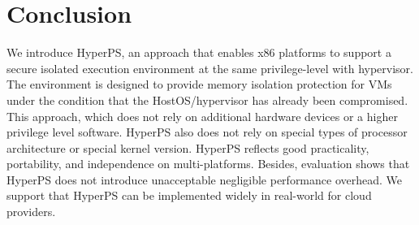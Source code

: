 \section{Conclusion}\label{sec:conclusion}
We introduce HyperPS, an approach that enables x86 platforms to support a secure isolated execution environment at the same privilege-level with hypervisor. The environment is designed to provide memory isolation protection for VMs under the condition that the HostOS/hypervisor has already been compromised. 
This approach, which does not rely on additional hardware devices or a higher privilege level software. HyperPS also does not rely on special types of processor architecture or special kernel version.
HyperPS reflects good practicality, portability, and independence on multi-platforms. Besides, evaluation shows that HyperPS does not introduce unacceptable negligible performance overhead. We support that HyperPS can be implemented widely in real-world for cloud providers.


